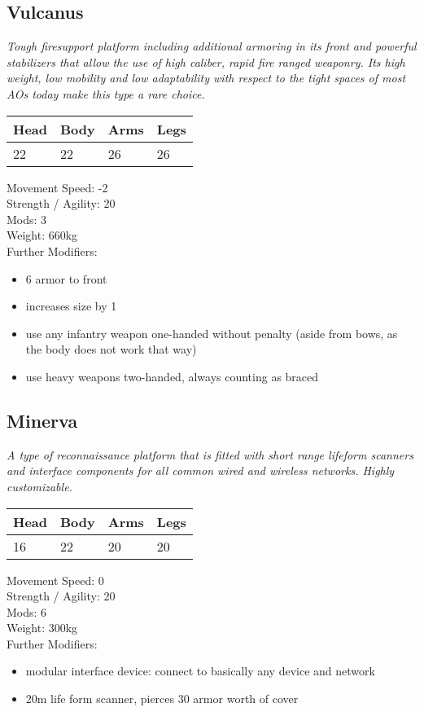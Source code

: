 \documentclass[12pt,a4paper,openany]{book}
\begin{document}
	\subsection{Vulcanus}
	\textit{Tough firesupport platform including additional armoring in its front and powerful stabilizers that allow the use of high caliber, rapid fire ranged weaponry. Its high weight, low mobility and low adaptability with respect to the tight spaces of most AOs today make this type a rare choice.}\par
	\begin{tabular}{|l|l|l|l|}
		\hline
		Head & Body & Arms & Legs\\
		\hline
		22 & 22 & 26 & 26\\
		\hline
	\end{tabular}
	\par
	Movement Speed: -2\\
	Strength / Agility: 20\\
	Mods: 3\\
	Weight: 660kg\\
	Further Modifiers:
	\vspace{-8mm}
	\begin{itemize}
		\setlength\itemsep{-8mm}
		\item 6 armor to front
		\item increases size by 1
		\item use any infantry weapon one-handed without penalty (aside from bows, as the body does not work that way)
		\item use heavy weapons two-handed, always counting as braced
	\end{itemize}
	\par
	\subsection{Minerva}
	\textit{A type of reconnaissance platform that is fitted with short range lifeform scanners and interface components for all common wired and wireless networks. Highly customizable.}\par
	\begin{tabular}{|l|l|l|l|}
		\hline
		Head & Body & Arms & Legs\\
		\hline
		16 & 22 & 20 & 20\\
		\hline
	\end{tabular}
	\par
	Movement Speed: 0\\
	Strength / Agility: 20\\
	Mods: 6\\
	Weight: 300kg\\
	Further Modifiers:
	\vspace{-8mm}
	\begin{itemize}
		\setlength\itemsep{-8mm}
		\item modular interface device: connect to basically any device and network
		\item 20m life form scanner, pierces 30 armor worth of cover
	\end{itemize}
	\par
\end{document}
